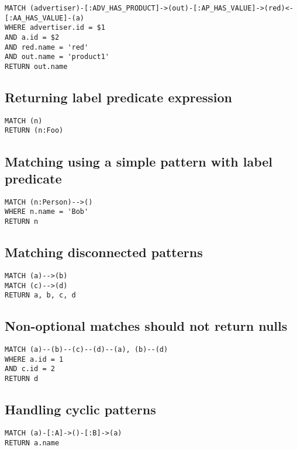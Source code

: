 \begin{lstlisting}
MATCH (advertiser)-[:ADV_HAS_PRODUCT]->(out)-[:AP_HAS_VALUE]->(red)<-[:AA_HAS_VALUE]-(a)
WHERE advertiser.id = $1
AND a.id = $2
AND red.name = 'red'
AND out.name = 'product1'
RETURN out.name
\end{lstlisting}

\subsection{Returning label predicate expression}

\begin{lstlisting}
MATCH (n)
RETURN (n:Foo)
\end{lstlisting}

\subsection{Matching using a simple pattern with label predicate}

\begin{lstlisting}
MATCH (n:Person)-->()
WHERE n.name = 'Bob'
RETURN n
\end{lstlisting}

\subsection{Matching disconnected patterns}

\begin{lstlisting}
MATCH (a)-->(b)
MATCH (c)-->(d)
RETURN a, b, c, d
\end{lstlisting}

\subsection{Non-optional matches should not return nulls}

\begin{lstlisting}
MATCH (a)--(b)--(c)--(d)--(a), (b)--(d)
WHERE a.id = 1
AND c.id = 2
RETURN d
\end{lstlisting}

\subsection{Handling cyclic patterns}

\begin{lstlisting}
MATCH (a)-[:A]->()-[:B]->(a)
RETURN a.name
\end{lstlisting}

